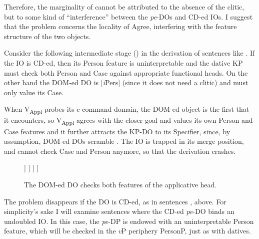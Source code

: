 \documentclass[output=paper,colorlinks,citecolor=brown,nonflat]{langsci/langscibook}
\begin{document}
Therefore, the marginality of  cannot be attributed to the absence of the clitic, but to some kind of “interference” between the \textit{pe}{}-DOs and CD-ed IOs. I suggest that the problem concerns the locality of Agree, interfering with the feature structure of the two objects.

Consider the following intermediate stage () in the derivation of sentences like . If the IO is CD-ed, then its Person feature is uninterpretable and the dative KP must check both Person and Case against appropriate functional heads. On the other hand the DOM-ed DO is [\textit{i}Pers] (since it does not need a clitic) and must only value its Case.

When V\textsubscript{Appl} probes its c-command domain, the DOM-ed object is the first that it encounters, so V\textsubscript{Appl} agrees with the closer goal and values its own Person and Case features and it further attracts the KP-DO to its Specifier, since, by assumption, DOM-ed DOs scramble \citep{López2012}. The IO is trapped in its merge position, and cannot check Case and Person anymore, so that the derivation crashes.

  \begin{figure}%
	\begin{forest}
		[\textit{v}P
			[\textit{v}
			]
			[V\textsubscript{Appl}P
				[V\textsubscript{Appl}\\
					\textbf{{[}{\textit{u}}{Pers}{]}}\\
					{[}\textit{u}Case:\textsc{acc}{]}
				]
				[VP
					[KP\textsubscript{DO}\\
						\textbf{{[}{\textit{i}}{Pers}{]}}\\
                                                {[}\textit{u}Case:\textsc{acc}{]}
					]
					[V'
						[V]
						[KP\textsubscript{do}\\
							\textbf{{[}{\textit{u}}{Pers}{]}}\\
							{[}\textit{u}Case:\textsc{dat}{]}
						]
					]
				]
			]
		]
	\end{forest}
	\caption{\label{fig:cornilescu:12} The DOM-ed DO checks both features of the applicative head.}
\end{figure}



The problem disappears if the DO is CD-ed, as in sentences ,  above. For simplicity’s sake I will examine sentences where the CD-ed \textit{pe}-DO binds an undoubled IO. In this case, the \textit{pe}-DP is endowed with an uninterpretable Person feature, which will be checked in the \textit{v}P periphery PersonP, just as with datives.
\end{document}

